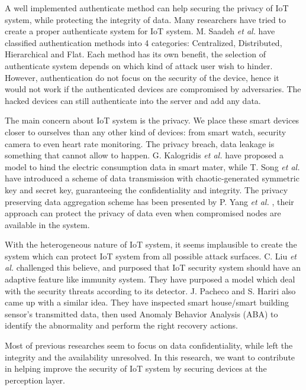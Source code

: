 A well implemented authenticate method can help securing the privacy of IoT system, while protecting the integrity of data. Many researchers have tried to create a proper authenticate system for IoT system. M. Saadeh \textit{et al.}\cite{AUTH1} have classified authentication methods into 4 categories: Centralized, Distributed, Hierarchical and Flat. Each method has its own benefit, the selection of authenticate system depends on which kind of attack user wish to hinder. However, authentication do not focus on the security of the device, hence it would not work if the authenticated devices are compromised by adversaries. The hacked devices can still authenticate into the server and add any data. 

 The main concern about IoT system is the privacy. We place these smart devices closer to ourselves than any other kind of devices: from smart watch, security camera to even heart rate monitoring. The privacy breach, data leakage is something that cannot allow to happen. G. Kalogridis \textit{et al.} \cite{PRIVACY1} have proposed a model to hind the electric consumption data in smart mater, while T. Song \textit{et al.} \cite{PRIVACY2} have introduced a scheme of data transmission with chaotic-generated symmetric key and secret key, guaranteeing the confidentiality and integrity. The privacy preserving data aggregation scheme has been presented by P. Yang \textit{et al.} \cite{PRIVACY3}, their approach can protect the privacy of data even when compromised nodes are available in the system.  

 With the heterogeneous nature of IoT system, it seems implausible to create the system which can protect IoT system from all possible attack surfaces. 
 C. Liu \textit{et al.} \cite{OTHER1} challenged this believe, and purposed that IoT security system should have an adaptive feature like immunity system. They have purposed a model which deal with the security threats according to its detector.
 J. Pacheco and S. Hariri \cite{OTHER2} also came up with a similar idea. They have inspected smart house/smart building sensor’s transmitted data, then used Anomaly Behavior Analysis (ABA) to identify the abnormality and perform the right recovery actions.  

 Most of previous researches seem to focus on data confidentiality, while left the integrity and the availability unresolved. In this research, we want to contribute in helping improve the security of IoT system by securing devices at the perception layer. 

 
